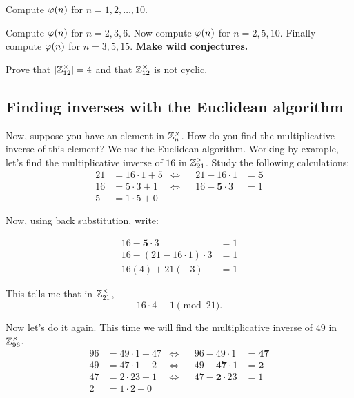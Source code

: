 \documentclass{ximera}
\begin{document}
\begin{exercise}
  Compute $\eulerphi(n)$ for $n = 1,2,\dots, 10$.
\end{exercise}




\begin{exercise}
  Compute $\eulerphi(n)$ for $n = 2,3,6$. Now compute $\eulerphi(n)$
  for $n = 2,5,10$. Finally compute $\eulerphi(n)$ for $n=
  3,5,15$. \textbf{Make wild conjectures.}
\end{exercise}


\begin{exercise}
  Prove that $|\mathbb Z^\times_{12}| = 4$ and that $\mathbb Z^\times_{12}$ is not
  cyclic.
\end{exercise}








\subsection{Finding inverses with the Euclidean algorithm}



Now, suppose you have an element in $\mathbb Z_n^\times$. How do you find the
multiplicative inverse of this element? We use the Euclidean
algorithm. Working by example, let's find
the multiplicative inverse of $16$ in $\mathbb Z_{21}^\times$. Study
the following calculations:
\begin{align*}
  21 &= 16\cdot 1 + 5 &\Leftrightarrow & &                21-16\cdot 1 &= \boldsymbol{5}\\ 
  16 &= 5\cdot 3 + 1 &\Leftrightarrow  & &   16 - \boldsymbol{5}\cdot 3 &= 1\\ 
  5 &= 1 \cdot 5 + 0 &  & & &
\end{align*}

Now, using back substitution, write:

\begin{align*}
16 - \boldsymbol{5}\cdot 3 &= 1 \\
16 - (21-16\cdot 1)\cdot 3 &= 1 \\
16(4) + 21(-3) &= 1
\end{align*}

This tells me that in $\mathbb Z_{21}^\times$,
\[
16\cdot 4 \equiv 1 \pmod{21}.
\]


Now let's do it again. This time we will find the multiplicative
inverse of $49$ in $\mathbb Z_{96}^\times$.
\begin{align*}
  96 &= 49\cdot 1 + 47 &\Leftrightarrow  & &                96 - 49\cdot 1 &= \boldsymbol{47}\\ 
  49 &= 47\cdot 1 + 2  &\Leftrightarrow  & &   49 - \boldsymbol{47}\cdot 1 &= \boldsymbol{2}\\ 
  47 &= 2 \cdot 23 + 1 &\Leftrightarrow  & &   47 - \boldsymbol{2}\cdot 23 &= 1 \\
  2 &= 1\cdot  2+ 0 & & & & 
\end{align*}
\end{document}
